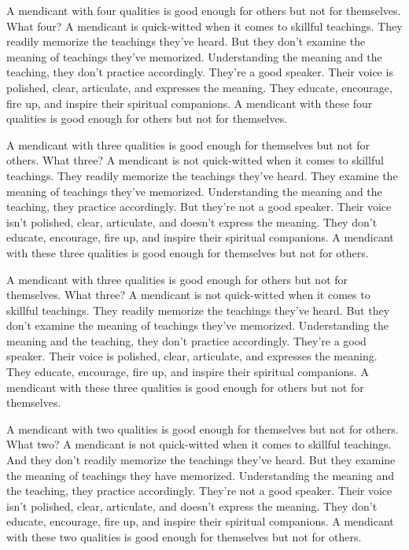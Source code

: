 \documentclass[12pt,openany]{book}%
\begin{document}
A mendicant with four qualities is good enough for others but not for themselves. What four? A mendicant is quick-witted when it comes to skillful teachings. They readily memorize the teachings they’ve heard. But they don’t examine the meaning of teachings they’ve memorized. Understanding the meaning and the teaching, they don’t practice accordingly. They’re a good speaker. Their voice is polished, clear, articulate, and expresses the meaning. They educate, encourage, fire up, and inspire their spiritual companions. A mendicant with these four qualities is good enough for others but not for themselves. 

A mendicant with three qualities is good enough for themselves but not for others. What three? A mendicant is not quick-witted when it comes to skillful teachings. They readily memorize the teachings they’ve heard. They examine the meaning of teachings they’ve memorized. Understanding the meaning and the teaching, they practice accordingly. But they’re not a good speaker. Their voice isn’t polished, clear, articulate, and doesn’t express the meaning. They don’t educate, encourage, fire up, and inspire their spiritual companions. A mendicant with these three qualities is good enough for themselves but not for others. 

A mendicant with three qualities is good enough for others but not for themselves. What three? A mendicant is not quick-witted when it comes to skillful teachings. They readily memorize the teachings they’ve heard. But they don’t examine the meaning of teachings they’ve memorized. Understanding the meaning and the teaching, they don’t practice accordingly. They’re a good speaker. Their voice is polished, clear, articulate, and expresses the meaning. They educate, encourage, fire up, and inspire their spiritual companions. A mendicant with these three qualities is good enough for others but not for themselves. 

A mendicant with two qualities is good enough for themselves but not for others. What two? A mendicant is not quick-witted when it comes to skillful teachings. And they don’t readily memorize the teachings they’ve heard. But they examine the meaning of teachings they have memorized. Understanding the meaning and the teaching, they practice accordingly. They’re not a good speaker. Their voice isn’t polished, clear, articulate, and doesn’t express the meaning. They don’t educate, encourage, fire up, and inspire their spiritual companions. A mendicant with these two qualities is good enough for themselves but not for others. 
\end{document}

